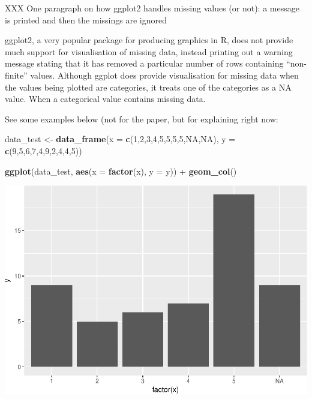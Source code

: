 \documentclass[]{article}
\newenvironment{Shaded}{\begin{snugshade}}{\end{snugshade}}
\newcommand{\KeywordTok}[1]{\textcolor[rgb]{0.13,0.29,0.53}{\textbf{{#1}}}}
\newcommand{\DataTypeTok}[1]{\textcolor[rgb]{0.13,0.29,0.53}{{#1}}}
\newcommand{\DecValTok}[1]{\textcolor[rgb]{0.00,0.00,0.81}{{#1}}}
\newcommand{\StringTok}[1]{\textcolor[rgb]{0.31,0.60,0.02}{{#1}}}
\newcommand{\OtherTok}[1]{\textcolor[rgb]{0.56,0.35,0.01}{{#1}}}
\newcommand{\NormalTok}[1]{{#1}}
\begin{document}
XXX One paragraph on how ggplot2 handles missing values (or not): a
message is printed and then the missings are ignored

ggplot2, a very popular package for producing graphics in R, does not
provide much support for visualisation of missing data, instead printing
out a warning message stating that it has removed a particular number of
rows containing ``non-finite'' values. Although ggplot does provide
visualisation for missing data when the values being plotted are
categories, it treats one of the categories as a NA value. When a
categorical value contains missing data.

See some examples below (not for the paper, but for explaining right
now:

\begin{Shaded}
\begin{Highlighting}[]
\NormalTok{data_test <-}\StringTok{ }\KeywordTok{data_frame}\NormalTok{(}\DataTypeTok{x =} \KeywordTok{c}\NormalTok{(}\DecValTok{1}\NormalTok{,}\DecValTok{2}\NormalTok{,}\DecValTok{3}\NormalTok{,}\DecValTok{4}\NormalTok{,}\DecValTok{5}\NormalTok{,}\DecValTok{5}\NormalTok{,}\DecValTok{5}\NormalTok{,}\DecValTok{5}\NormalTok{,}\OtherTok{NA}\NormalTok{,}\OtherTok{NA}\NormalTok{),}
                        \DataTypeTok{y =} \KeywordTok{c}\NormalTok{(}\DecValTok{9}\NormalTok{,}\DecValTok{5}\NormalTok{,}\DecValTok{6}\NormalTok{,}\DecValTok{7}\NormalTok{,}\DecValTok{4}\NormalTok{,}\DecValTok{9}\NormalTok{,}\DecValTok{2}\NormalTok{,}\DecValTok{4}\NormalTok{,}\DecValTok{4}\NormalTok{,}\DecValTok{5}\NormalTok{))}

  \KeywordTok{ggplot}\NormalTok{(data_test,}
         \KeywordTok{aes}\NormalTok{(}\DataTypeTok{x =} \KeywordTok{factor}\NormalTok{(x),}
             \DataTypeTok{y =} \NormalTok{y)) +}\StringTok{ }
\StringTok{  }\KeywordTok{geom_col}\NormalTok{()}
\end{Highlighting}
\end{Shaded}

\includegraphics{jsm2017_files/figure-latex/unnamed-chunk-2-1.pdf}
\end{document}
